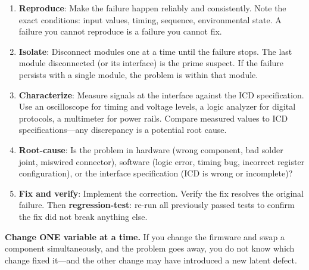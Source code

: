 \documentclass[11pt,letterpaper,twoside,openany]{book}
\begin{document}
\begin{enumerate}[leftmargin=1.5em]
\item \textbf{Reproduce}: Make the failure happen reliably and consistently. Note the exact conditions: input values, timing, sequence, environmental state. A failure you cannot reproduce is a failure you cannot fix.
\item \textbf{Isolate}: Disconnect modules one at a time until the failure stops. The last module disconnected (or its interface) is the prime suspect. If the failure persists with a single module, the problem is within that module.
\item \textbf{Characterize}: Measure signals at the interface against the ICD specification. Use an oscilloscope for timing and voltage levels, a logic analyzer for digital protocols, a multimeter for power rails. Compare measured values to ICD specifications---any discrepancy is a potential root cause.
\item \textbf{Root-cause}: Is the problem in hardware (wrong component, bad solder joint, miswired connector), software (logic error, timing bug, incorrect register configuration), or the interface specification (ICD is wrong or incomplete)?
\item \textbf{Fix and verify}: Implement the correction. Verify the fix resolves the original failure. Then \textbf{regression-test}: re-run all previously passed tests to confirm the fix did not break anything else.
\end{enumerate}

\textbf{Change ONE variable at a time.} If you change the firmware and swap a component simultaneously, and the problem goes away, you do not know which change fixed it---and the other change may have introduced a new latent defect.
\end{document}
